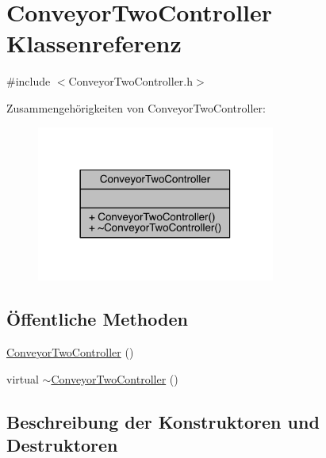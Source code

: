 \hypertarget{class_conveyor_two_controller}{}\section{Conveyor\+Two\+Controller Klassenreferenz}
\label{class_conveyor_two_controller}


{\ttfamily \#include $<$Conveyor\+Two\+Controller.\+h$>$}



Zusammengehörigkeiten von Conveyor\+Two\+Controller\+:
\nopagebreak
\begin{figure}[H]
\begin{center}
\leavevmode
\includegraphics[width=222pt]{class_conveyor_two_controller__coll__graph}
\end{center}
\end{figure}
\subsection*{Öffentliche Methoden}
\begin{DoxyCompactItemize}
\item 
\hyperlink{class_conveyor_two_controller_abf1818572c62c90a086af7b92116d91c}{Conveyor\+Two\+Controller} ()
\item 
virtual \hyperlink{class_conveyor_two_controller_a7b2d996e62a8467455279ce295b5c889}{$\sim$\+Conveyor\+Two\+Controller} ()
\end{DoxyCompactItemize}


\subsection{Beschreibung der Konstruktoren und Destruktoren}
\hypertarget{class_conveyor_two_controller_abf1818572c62c90a086af7b92116d91c}{}\label{class_conveyor_two_controller_abf1818572c62c90a086af7b92116d91c} 
